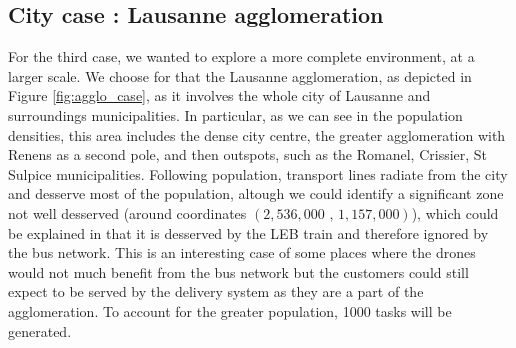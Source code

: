 \subsection{City case : Lausanne agglomeration}

For the third case, we wanted to explore a more complete environment, at a larger scale. We choose for that the Lausanne agglomeration, as depicted in Figure \ref{fig:agglo_case}, as it involves the whole city of Lausanne and surroundings municipalities. In particular, as we can see in the population densities, this area includes the dense city centre, the greater agglomeration with Renens as a second pole, and then outspots, such as the Romanel, Crissier, St Sulpice municipalities. Following population, transport lines radiate from the city and desserve most of the population, altough we could identify a significant zone not well desserved (around coordinates $(2,536,000\text{ , }1,157,000)$), which could be explained in that it is desserved by the LEB train and therefore ignored by the bus network. This is an interesting case of some places where the drones would not much benefit from the bus network but the customers could still expect to be served by the delivery system as they are a part of the agglomeration. To account for the greater population, 1000 tasks will be generated.

